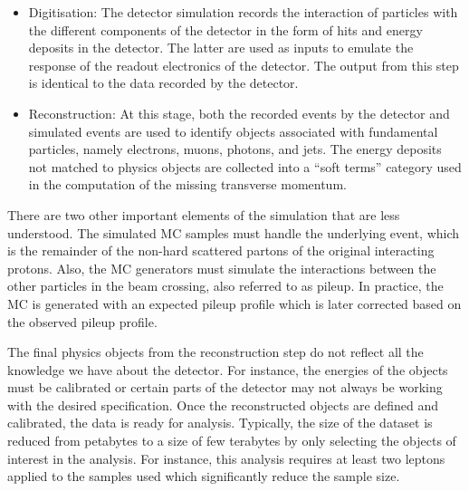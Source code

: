 \begin{itemize}
\item Digitisation: The detector simulation records the interaction of particles with the different components of the detector in the form of hits and energy deposits in the detector.
  The latter are used as inputs to emulate the response of the readout electronics of the detector. The output from this step is identical to the data recorded by the detector.
\item Reconstruction: At this stage, both the recorded events by the detector and simulated events are used to identify objects associated with fundamental particles, namely 
  electrons, muons, photons, and jets. The energy deposits not matched to physics objects are collected into a ``soft terms'' category used in the computation of the missing transverse momentum.  
\end{itemize} 

There are two other important elements of the simulation that are less understood. The simulated MC samples must handle the underlying event, which is the remainder of the non-hard scattered partons of 
the original interacting protons. Also, the MC generators must simulate the interactions between the other particles in the beam crossing, also referred to as pileup. In practice, 
the MC is generated with an expected pileup profile which is later corrected based on the observed pileup profile.


The final physics objects from the reconstruction step do not reflect all the knowledge we have about the detector. For instance, the energies of the objects must be calibrated
or certain parts of the detector may not always be working with the desired specification. 
 Once the reconstructed objects are defined and calibrated, the data is ready for analysis. Typically, the size of the dataset is reduced from petabytes to a size of few terabytes
  by only selecting the objects of interest in the analysis. For instance, this analysis requires at least two leptons applied to the samples used which significantly reduce the sample size.
